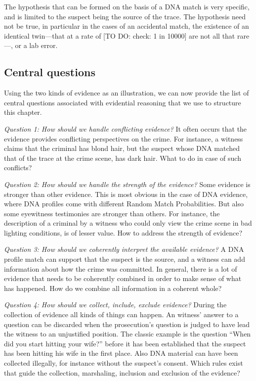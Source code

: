\documentclass[10pt]{article}
\begin{document}
The hypothesis that can be formed on the basis of a DNA match is very specific, and is limited to the suspect being the source of the trace. The hypothesis need not be true, in particular in the cases of an accidental match, the existence of an identical twin---that at a rate of [TO DO: check: 1 in 10000] are not all that rare---, or a lab error. 

\subsection{Central questions}

Using the two kinds of evidence as an illustration, we can now provide the list of central questions associated with evidential reasoning that we use to structure this chapter.

\textit{Question 1:	How should we handle conflicting evidence?}
It often occurs that the evidence provides conflicting perspectives on the crime. For instance, a witness claims that the criminal has blond hair, but the suspect whose DNA matched that of the trace at the crime scene, has dark hair. What to do in case of such conflicts?

\textit{Question 2:	How should we handle the strength of the evidence?}
Some evidence is stronger than other evidence. This is most obvious in the case of DNA evidence, where DNA profiles come with different Random Match Probabilities. But also some eyewitness testimonies are stronger than others. For instance, the description of a criminal by a witness who could only view the crime scene in bad lighting conditions, is of lesser value. How to address the strength of evidence?

\textit{Question 3:	How should we coherently interpret the available evidence?}
A DNA profile match can support that the suspect is the source, and a witness can add information about how the crime was committed. In general, there is a lot of evidence that needs to be coherently combined in order to make sense of what has happened. How do we combine all information in a coherent whole?

\textit{Question 4:	How should we collect, include, exclude evidence?}
During the collection of evidence all kinds of things can happen. An witness' answer to a question can be discarded when the prosecution's question is judged to have lead the witness to an unjustified position. The classic example is the question ``When did you start hitting your wife?'' before it has been established that the suspect has been hitting his wife in the first place. Also DNA material can have been collected illegally, for instance without the suspect's consent. Which rules exist that guide the collection, marshaling, inclusion and exclusion of the evidence?
\end{document}

